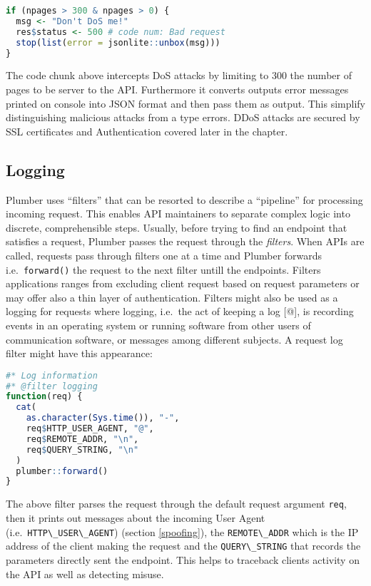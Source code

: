 \documentclass[
  12pt,
  a4paper,
  oneside]{book}
\newcommand{\passthrough}[1]{#1}
\theoremstyle{definition}
\theoremstyle{definition}
\theoremstyle{definition}
\theoremstyle{remark}
\begin{document}
\begin{lstlisting}[language=R]
if (npages > 300 & npages > 0) {
  msg <- "Don't DoS me!"
  res$status <- 500 # code num: Bad request
  stop(list(error = jsonlite::unbox(msg)))
}
\end{lstlisting}

The code chunk above intercepts DoS attacks by limiting to 300 the number of pages to be server to the API. Furthermore it converts outputs error messages printed on console into JSON format and then pass them as output. This simplify distinguishing malicious attacks from a type errors. DDoS attacks are secured by SSL certificates and Authentication covered later in the chapter.

\hypertarget{logging}{%
\subsection{Logging}\label{logging}}

Plumber uses ``filters'' that can be resorted to describe a ``pipeline'' for processing incoming request. This enables API maintainers to separate complex logic into discrete, comprehensible steps. Usually, before trying to find an endpoint that satisfies a request, Plumber passes the request through the \emph{filters}. When APIs are called, requests pass through filters one at a time and Plumber forwards i.e.~\passthrough{\lstinline!forward()!} the request to the next filter untill the endpoints. Filters applications ranges from excluding client request based on request parameters or may offer also a thin layer of authentication. Filters might also be used as a logging for requests where logging, i.e.~the act of keeping a log {[}@{]}, is recording events in an operating system or running software from other users of communication software, or messages among different subjects.
A request log filter might have this appearance:

\begin{lstlisting}[language=R]
#* Log information
#* @filter logging
function(req) {
  cat(
    as.character(Sys.time()), "-",
    req$HTTP_USER_AGENT, "@",
    req$REMOTE_ADDR, "\n",
    req$QUERY_STRING, "\n"
  )
  plumber::forward()
}
\end{lstlisting}

The above filter parses the request through the default request argument \passthrough{\lstinline!req!}, then it prints out messages about the incoming User Agent (i.e.~\passthrough{\lstinline!HTTP\_USER\_AGENT!}) (section \ref{spoofing}), the \passthrough{\lstinline!REMOTE\_ADDR!} which is the IP address of the client making the request \citeyearpar{plumber} and the \passthrough{\lstinline!QUERY\_STRING!} that records the parameters directly sent the endpoint. This helps to traceback clients activity on the API as well as detecting misuse.
\end{document}
